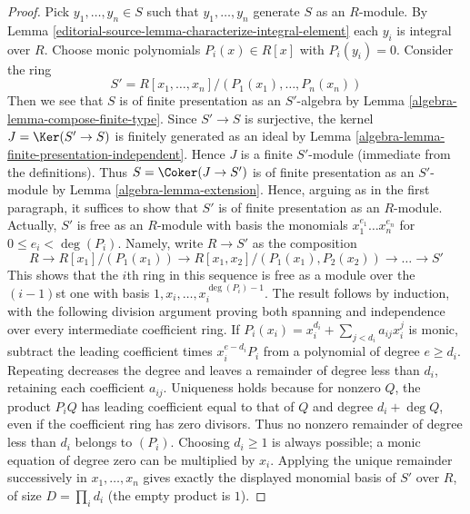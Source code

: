 \begin{proof}
\medskip\noindent
Pick $y_1, \ldots, y_n \in S$ such that $y_1, \ldots, y_n$ generate $S$
as an $R$-module. By Lemma \ref{editorial-source-lemma-characterize-integral-element}
each $y_i$ is integral over $R$. Choose monic polynomials
$P_i(x) \in R[x]$ with $P_i(y_i) = 0$. Consider the ring
$$
S' = R[x_1, \ldots, x_n]/(P_1(x_1), \ldots, P_n(x_n))
$$
Then we see that $S$ is of finite presentation as an $S'$-algebra
by Lemma \ref{algebra-lemma-compose-finite-type}. Since $S' \to S$ is surjective,
the kernel $J = \Ker(S' \to S)$ is finitely generated as an ideal by
Lemma \ref{algebra-lemma-finite-presentation-independent}. Hence $J$ is a finite
$S'$-module (immediate from the definitions).
Thus $S = \Coker(J \to S')$ is  of finite presentation as an $S'$-module
by Lemma \ref{algebra-lemma-extension}.
Hence, arguing as in the first paragraph, it suffices to show that $S'$ is
of finite presentation as an $R$-module. Actually, $S'$ is free as an
$R$-module with basis the monomials $x_1^{e_1} \ldots x_n^{e_n}$
for $0 \leq e_i < \deg(P_i)$. Namely, write $R \to S'$ as the composition
$$
R \to R[x_1]/(P_1(x_1)) \to R[x_1, x_2]/(P_1(x_1), P_2(x_2)) \to
\ldots \to S'
$$
This shows that the $i$th ring in this sequence is free as a module over the
$(i - 1)$st one with basis $1, x_i, \ldots, x_i^{\deg(P_i) - 1}$. The result
follows by induction, with the following division argument proving
both spanning and independence over every intermediate coefficient
ring. If $P_i(x_i)=x_i^{d_i}+\sum_{j<d_i}a_{ij}x_i^j$ is monic,
subtract the leading coefficient times $x_i^{e-d_i}P_i$ from
a polynomial of degree $e\geq d_i$. Repeating decreases the degree
and leaves a remainder of degree less than $d_i$, retaining each
coefficient $a_{ij}$. Uniqueness holds because for nonzero $Q$,
the product $P_iQ$ has leading coefficient equal to that of $Q$
and degree $d_i+\deg Q$, even if the coefficient ring has
zero divisors. Thus no nonzero remainder of degree less than
$d_i$ belongs to $(P_i)$. Choosing $d_i\geq1$ is always possible;
a monic equation of degree zero can be multiplied by $x_i$.
Applying the unique remainder successively in $x_1,\ldots,x_n$
gives exactly the displayed monomial basis of $S'$ over $R$,
of size $D=\prod_i d_i$ (the empty product is $1$).


\end{proof}

